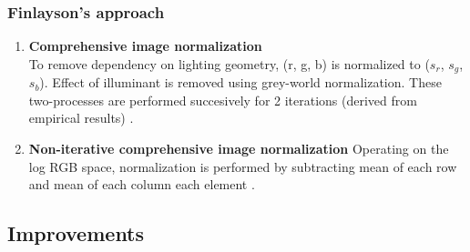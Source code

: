 \documentclass[fypca]{socreport}
\begin{document}
\subsubsection{Finlayson's approach}

\begin{enumerate}

\item \textbf{Comprehensive image normalization} \\
To remove dependency on lighting geometry, (r, g, b) is normalized to ($s_r$,
$s_g$, $s_b$). Effect of illuminant is removed using grey-world normalization.
These two-processes are performed succesively for 2 iterations (derived from
empirical results) .

\item \textbf{Non-iterative comprehensive image normalization}
Operating on the log RGB space, normalization is performed by subtracting mean
of each row and mean of each column each element .

\end{enumerate}

\subsection{Improvements}
\end{document}
